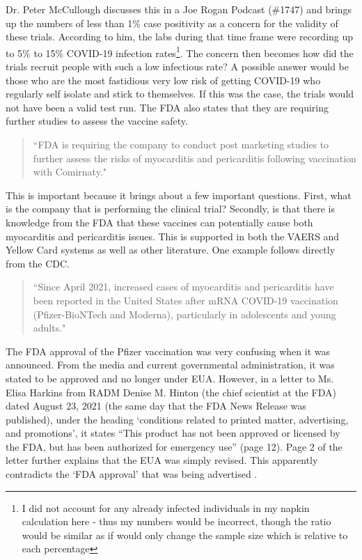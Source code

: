 \documentclass[10pt, a4paper, twocolumn]{book}
\begin{document}
Dr. Peter McCullough discusses this in a Joe Rogan Podcast (\#1747) and brings up the numbers of less than 1\% case positivity as a concern for the validity of these trials. According to him, the labs during that time frame were recording up to 5\% to 15\% COVID-19 infection rates\footnote{I did not account for any already infected individuals in my napkin calculation here - thus my numbers would be incorrect, though the ratio would be similar as if would only change the sample size which is relative to each percentage}. The concern then becomes how did the trials recruit people with such a low infectious rate? A possible answer would be those who are the most fastidious very low risk of getting COVID-19 who regularly self isolate and stick to themselves. If this was the case, the trials would not have been a valid test run. The FDA also states that they are requiring further studies to assess the vaccine safety.

\begin{quotation}
	``FDA is requiring the company to conduct post marketing studies to further assess the risks of myocarditis and pericarditis following vaccination with Comirnaty." \citep{FDAApprovesVaccine}
\end{quotation}

This is important because it brings about a few important questions. First, what is the company that is performing the clinical trial? Secondly, is that there is knowledge from the FDA that these vaccines can potentially cause both myocarditis and pericarditis issues. This is supported in both the VAERS and Yellow Card systems as well as other literature. One example follows directly from the CDC.

\begin{quotation}
	``Since April 2021, increased cases of myocarditis and pericarditis have been reported in the United States after mRNA COVID-19 vaccination (Pfizer-BioNTech and Moderna), particularly in adolescents and young adults." \citep{CDCMyocarditisAndPericarditis}
\end{quotation}

The FDA approval of the Pfizer vaccination was very confusing when it was announced. From the media and current governmental administration, it was stated to be approved and no longer under EUA. However, in a letter to Ms. Elisa Harkins from RADM Denise M. Hinton (the chief scientist at the FDA) dated August 23, 2021 (the same day that the FDA News Release was published), under the heading `conditions related to printed matter, advertising, and promotions', it states ``This product has not been approved or licensed by the FDA, but has been authorized for emergency use'' (page 12). Page 2 of the letter further explains that the EUA was simply revised. This apparently contradicts the `FDA approval' that was being advertised \citep{FDAEUALetter}.
\end{document}
